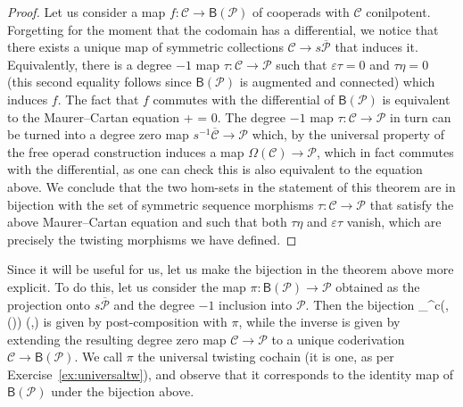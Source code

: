 \documentclass[fleqn, a4paper, twoside]{article}
\makeatletter
\newcommand{\0}{\langle 0\rangle}
\newcommand{\B}[1]{\mathsf{B}(#1)}
\let\[\@undefined
\DeclareRobustCommand{\[}{\begin{equation}}%
\let\]\@undefined
\DeclareRobustCommand{\]}{\end{equation}}%
\theoremstyle{mytheorem}
\theoremstyle{introthm}
\theoremstyle{mydefinition}
\theoremstyle{mydefinition2}
\theoremstyle{plain} %
\newcommand{\CC}{\mathcal{C}}
\newcommand{\?}{\,?\,}
\newcommand{\PP}{{\mathcal{P}}}
\theoremstyle{mytheorem}
\theoremstyle{plain} %
\makeatother
\begin{document}
\begin{proof}
Let us consider a map $f : \CC \longrightarrow \B{\PP}$ of cooperads
with $\CC$ conilpotent. Forgetting for the moment that the codomain
has a differential, we notice that there exists a unique map of
symmetric collections $\CC \longrightarrow s\overline{\PP}$
that induces it. Equivalently, there is a degree $-1$ map
$\tau : \CC \longrightarrow \PP$ such that $\varepsilon\tau = 0$
and $\tau\eta = 0$ (this second equality follows since $\B{\PP}$ is
augmented and connected)
which induces $f$. The fact that $f$ commutes with the differential of
$\B{\PP}$ is equivalent to the Maurer--Cartan equation
\[
\partial \tau + \tau\star\tau = 0.
\]
The degree $-1$ map $\tau : \CC\longrightarrow \PP$ in turn can
be turned into a degree zero map $s^{-1}\overline{\CC}\longrightarrow
\PP$ which, by the universal property of the free operad construction
induces a map $\Omega(\CC) \longrightarrow \PP$, which in fact commutes with
the differential, as one can check this is also equivalent
to the equation above. We conclude that the two hom-sets in
the statement of this theorem are in bijection with the set
of symmetric sequence morphisms $\tau : \CC\longrightarrow \PP$
that satisfy the above Maurer--Cartan equation and
such that both $\tau\eta$ and $\varepsilon\tau$ vanish,
which are precisely the twisting morphisms we have defined.
\end{proof}

Since it will be useful for us, let us make the bijection
in the theorem above more explicit. To do this, let us consider
the map $\pi : \B{\PP} \longrightarrow \PP$ obtained
as the projection onto $s\overline{\PP}$ and the degree
$-1$ inclusion into $\PP$. Then the bijection
\[
\hom_{^c}(\CC,\B{\PP})
 	\longrightarrow
 	 (\CC,\PP)
\]
is given by post-composition with $\pi$, while the
inverse is given by extending the
resulting degree zero map 
$\CC\longrightarrow \PP$ to a unique coderivation
$\CC\longrightarrow \B{\PP}$. We call $\pi$
the universal twisting cochain (it is one, as per
Exercise~\ref{ex:universaltw}), and observe that it
corresponds to the identity map of $\B{\PP}$ under
the bijection above. 
\end{document}
